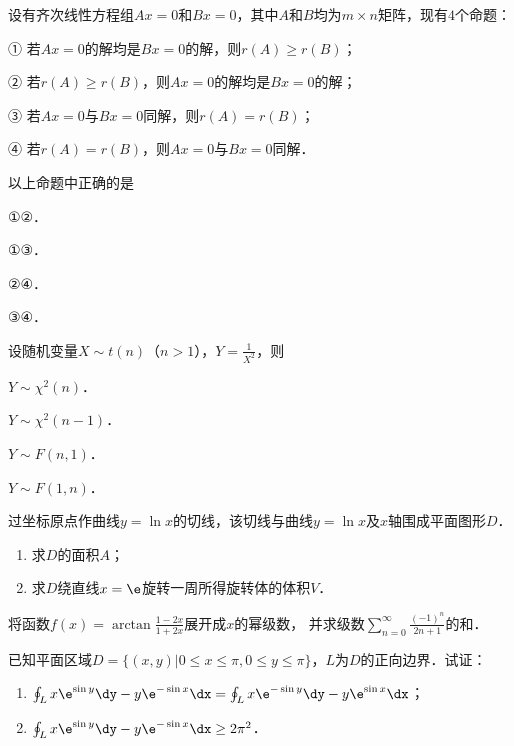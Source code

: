 \documentclass[plain,noanswer,medmath]{../../template/jnuexam}
\begin{document}
\begin{problem}
设有齐次线性方程组$Ax = 0$和$Bx = 0$，其中$A$和$B$均为$m \times n$矩阵，现有$4$个命题：\par
① 若$Ax = 0$的解均是$Bx = 0$的解，则$r(A) \ge r(B)$；\par
② 若$r(A) \ge r(B)$，则$Ax = 0$的解均是$Bx = 0$的解；\par
③ 若$Ax = 0$与$Bx = 0$同解，则$r(A) = r(B)$；\par
④ 若$r(A) = r(B)$，则$Ax = 0$与$Bx = 0$同解．\par
以上命题中正确的是\pickout{}
\begin{abcd}
\item ①②．
\item ①③．
\item ②④．
\item ③④．
\end{abcd}
\end{problem}


\begin{problem}
设随机变量$X\sim t(n)$（$n > 1$），$Y = \frac{1}{X^2}$，则\pickout{}
\begin{abcd}
\item $Y\sim \chi^2(n)$．
\item $Y\sim \chi^2(n - 1)$．
\item $Y\sim F(n,1)$．
\item $Y\sim F(1,n)$．
\end{abcd}
\end{problem}



\begin{problem}
过坐标原点作曲线$y = \ln x$的切线，该切线与曲线$y = \ln x$及$x$轴围成平面图形$D$．
\begin{enumerate}
\item 求$D$的面积$A$；
\item 求$D$绕直线$x = \e$旋转一周所得旋转体的体积$V$．
\end{enumerate}
\end{problem}



\begin{problem}
将函数$f(x) = \arctan \frac{1 - 2x}{1 + 2x}$展开成$x$的幂级数，
并求级数$\sum_{n = 0}^{\infty}\frac{(- 1)^n}{2n + 1}$的和．
\end{problem}



\begin{problem}
已知平面区域$D = \{(x,y)\left| 0 \le x \le \pi ,0 \le y \le \pi \right.\}$，$L$为$D$的正向边界．试证：
\begin{enumerate}
\item $\oint_L x\e^{\sin y} \dy - y\e^{- \sin x} \dx = \oint_L x\e^{- \sin y} \dy - y\e^{\sin x} \dx$；
\item $\oint_L x\e^{\sin y} \dy - y\e^{- \sin x} \dx \ge 2\pi^2$．
\end{enumerate}
\end{problem}
\end{document}
